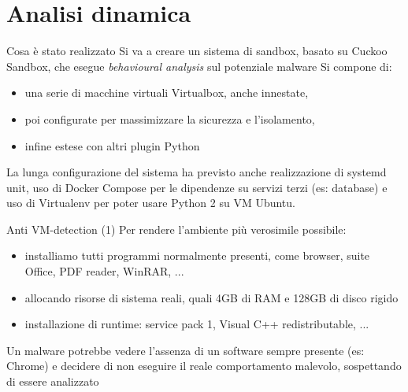 \section{Analisi dinamica}

\begin{frame}{Cosa è stato realizzato}
Si va a creare un sistema di sandbox, basato su Cuckoo Sandbox,
che esegue \emph{behavioural analysis} sul potenziale malware
\vfill
Si compone di:
\begin{itemize}
    \item una serie di macchine virtuali Virtualbox, anche innestate,
    \item poi configurate per massimizzare la sicurezza e l'isolamento,
    \item infine estese con altri plugin Python
\end{itemize}
\vfill
La lunga configurazione del sistema ha previsto anche realizzazione di systemd unit, uso di Docker Compose per le dipendenze su servizi terzi (es: database) e uso di Virtualenv per poter usare Python 2 su VM Ubuntu.
\end{frame}

\begin{frame}{Anti VM-detection (1)}
Per rendere l'ambiente più verosimile possibile:
\begin{itemize}
    \item installiamo tutti programmi normalmente presenti, come browser, suite Office, PDF reader, WinRAR, ...
    \item allocando risorse di sistema reali, quali 4GB di RAM e 128GB di disco rigido
    \item installazione di runtime: service pack 1, Visual C++ redistributable, ...
\end{itemize}
\vfill
Un malware potrebbe vedere l'assenza di un software sempre presente (es: Chrome) e decidere di non eseguire il reale comportamento malevolo, sospettando di essere analizzato
\end{frame}

